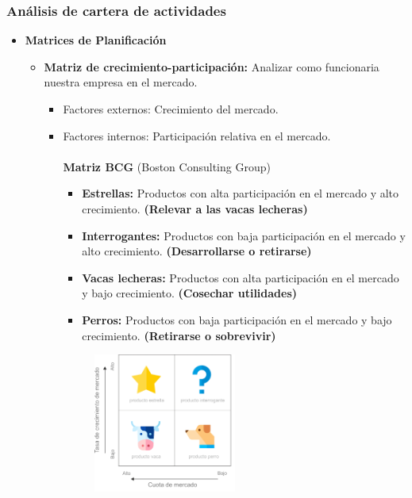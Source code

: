 \documentclass{templateNote}
\begin{document}
\subsubsection{Análisis de cartera de actividades}
    \begin{itemize}
        \item \textbf{Matrices de Planificación}
        \begin{itemize}
            \item \textbf{Matriz de crecimiento-participación:} Analizar como funcionaria nuestra empresa en el mercado.
            \begin{itemize}
                \item Factores externos: Crecimiento del mercado.
                \item Factores internos: Participación relativa en el mercado. \\\\
                \textbf{Matriz BCG} (Boston Consulting Group)
                \begin{itemize}
                    \item \textbf{Estrellas:} Productos con alta participación en el mercado y alto crecimiento. \textbf{(Relevar a las vacas lecheras)}
                    \item \textbf{Interrogantes:} Productos con baja participación en el mercado y alto crecimiento. \textbf{(Desarrollarse o retirarse)}
                    \item \textbf{Vacas lecheras:} Productos con alta participación en el mercado y bajo crecimiento. \textbf{(Cosechar utilidades)}
                    \item \textbf{Perros:} Productos con baja participación en el mercado y bajo crecimiento. \textbf{(Retirarse o sobrevivir)}
                \end{itemize}
                \begin{figure}[H]
                    \centering
                    \includegraphics[width=0.5\textwidth]{img/matriz_bcg-768x803.png}

\end{figure}
\end{itemize}
\end{itemize}
\end{itemize}
\end{document}
